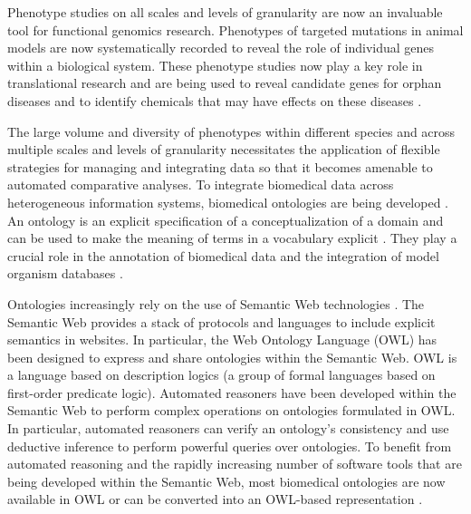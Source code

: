 \documentclass[11pt]{article}
\renewcommand{\cite}{\citep}
\begin{document}
Phenotype studies on all scales and levels of granularity are now an
invaluable tool for functional genomics research. Phenotypes of
targeted mutations in animal models are now systematically recorded to
reveal the role of individual genes within a biological system. These
phenotype studies now play a key role in translational research and
are being used to reveal candidate genes for orphan diseases and to
identify chemicals that may have effects on these diseases
\cite{Schofield2011}.

The large volume and diversity of phenotypes within different species
and across multiple scales and levels of granularity necessitates the
application of flexible strategies for managing and integrating data
so that it becomes amenable to automated comparative analyses. To
integrate biomedical data across heterogeneous information systems,
biomedical ontologies are being developed \cite{Smith2007}. An
ontology is an explicit specification of a conceptualization of a
domain and can be used to make the meaning of terms in a vocabulary
explicit \cite{Gruber1995, Guarino1998}. They play a crucial role in
the annotation of biomedical data and the integration of model
organism databases \cite{go2010, Bada2004, goble}.

Ontologies increasingly rely on the use of Semantic Web technologies
\cite{Berners-Lee2001}. The Semantic Web provides a stack of protocols
and languages to include explicit semantics in websites. In
particular, the Web Ontology Language (OWL) \cite{Grau2008} has been
designed to express and share ontologies within the Semantic Web. OWL
is a language based on description logics (a group of formal languages
based on first-order predicate logic). Automated reasoners have been
developed within the Semantic Web to perform complex operations on
ontologies formulated in OWL. In particular, automated reasoners can
verify an ontology's consistency and use deductive inference to
perform powerful queries over ontologies. To benefit from automated
reasoning and the rapidly increasing number of software tools that are
being developed within the Semantic Web, most biomedical ontologies
are now available in OWL or can be converted into an OWL-based
representation \cite{Horrocks2007, Hoehndorf2010patterns}.
\end{document}
